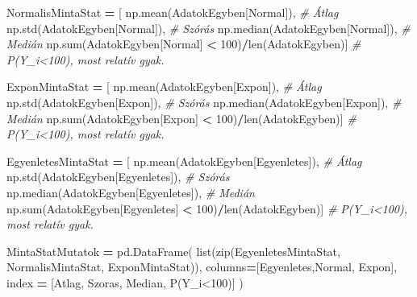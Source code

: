 \documentclass[
]{book}
\newenvironment{Shaded}{\begin{snugshade}}{\end{snugshade}}
\newcommand{\BuiltInTok}[1]{#1}
\newcommand{\CommentTok}[1]{\textcolor[rgb]{0.56,0.35,0.01}{\textit{#1}}}
\newcommand{\DecValTok}[1]{\textcolor[rgb]{0.00,0.00,0.81}{#1}}
\newcommand{\NormalTok}[1]{#1}
\newcommand{\OperatorTok}[1]{\textcolor[rgb]{0.81,0.36,0.00}{\textbf{#1}}}
\newcommand{\StringTok}[1]{\textcolor[rgb]{0.31,0.60,0.02}{#1}}
\begin{document}
\begin{Shaded}
\begin{Highlighting}[]
\NormalTok{NormalisMintaStat }\OperatorTok{=}\NormalTok{ [}
\NormalTok{  np.mean(AdatokEgyben[}\StringTok{\textquotesingle{}Normal\textquotesingle{}}\NormalTok{]), }\CommentTok{\# Átlag}
\NormalTok{  np.std(AdatokEgyben[}\StringTok{\textquotesingle{}Normal\textquotesingle{}}\NormalTok{]), }\CommentTok{\# Szórás}
\NormalTok{  np.median(AdatokEgyben[}\StringTok{\textquotesingle{}Normal\textquotesingle{}}\NormalTok{]), }\CommentTok{\# Medián}
\NormalTok{  np.}\BuiltInTok{sum}\NormalTok{(AdatokEgyben[}\StringTok{\textquotesingle{}Normal\textquotesingle{}}\NormalTok{] }\OperatorTok{\textless{}} \DecValTok{100}\NormalTok{)}\OperatorTok{/}\BuiltInTok{len}\NormalTok{(AdatokEgyben)] }\CommentTok{\# P(Y\_i\textless{}100), most relatív gyak.}

\NormalTok{ExponMintaStat }\OperatorTok{=}\NormalTok{ [}
\NormalTok{  np.mean(AdatokEgyben[}\StringTok{\textquotesingle{}Expon\textquotesingle{}}\NormalTok{]), }\CommentTok{\# Átlag}
\NormalTok{  np.std(AdatokEgyben[}\StringTok{\textquotesingle{}Expon\textquotesingle{}}\NormalTok{]), }\CommentTok{\# Szórás}
\NormalTok{  np.median(AdatokEgyben[}\StringTok{\textquotesingle{}Expon\textquotesingle{}}\NormalTok{]), }\CommentTok{\# Medián}
\NormalTok{  np.}\BuiltInTok{sum}\NormalTok{(AdatokEgyben[}\StringTok{\textquotesingle{}Expon\textquotesingle{}}\NormalTok{] }\OperatorTok{\textless{}} \DecValTok{100}\NormalTok{)}\OperatorTok{/}\BuiltInTok{len}\NormalTok{(AdatokEgyben)] }\CommentTok{\# P(Y\_i\textless{}100), most relatív gyak.}

\NormalTok{EgyenletesMintaStat }\OperatorTok{=}\NormalTok{ [}
\NormalTok{  np.mean(AdatokEgyben[}\StringTok{\textquotesingle{}Egyenletes\textquotesingle{}}\NormalTok{]), }\CommentTok{\# Átlag}
\NormalTok{  np.std(AdatokEgyben[}\StringTok{\textquotesingle{}Egyenletes\textquotesingle{}}\NormalTok{]), }\CommentTok{\# Szórás}
\NormalTok{  np.median(AdatokEgyben[}\StringTok{\textquotesingle{}Egyenletes\textquotesingle{}}\NormalTok{]), }\CommentTok{\# Medián}
\NormalTok{  np.}\BuiltInTok{sum}\NormalTok{(AdatokEgyben[}\StringTok{\textquotesingle{}Egyenletes\textquotesingle{}}\NormalTok{] }\OperatorTok{\textless{}} \DecValTok{100}\NormalTok{)}\OperatorTok{/}\BuiltInTok{len}\NormalTok{(AdatokEgyben)] }\CommentTok{\# P(Y\_i\textless{}100), most relatív gyak.}

\NormalTok{MintaStatMutatok }\OperatorTok{=}\NormalTok{ pd.DataFrame(}
  \BuiltInTok{list}\NormalTok{(}\BuiltInTok{zip}\NormalTok{(EgyenletesMintaStat, NormalisMintaStat, ExponMintaStat)),}
\NormalTok{  columns}\OperatorTok{=}\NormalTok{[}\StringTok{\textquotesingle{}Egyenletes\textquotesingle{}}\NormalTok{,}\StringTok{\textquotesingle{}Normal\textquotesingle{}}\NormalTok{, }\StringTok{\textquotesingle{}Expon\textquotesingle{}}\NormalTok{],}
\NormalTok{  index }\OperatorTok{=}\NormalTok{ [}\StringTok{\textquotesingle{}Atlag\textquotesingle{}}\NormalTok{, }\StringTok{\textquotesingle{}Szoras\textquotesingle{}}\NormalTok{, }\StringTok{\textquotesingle{}Median\textquotesingle{}}\NormalTok{, }\StringTok{\textquotesingle{}P(Y\_i\textless{}100)\textquotesingle{}}\NormalTok{]}
\NormalTok{)}


\end{Highlighting}
\end{Shaded}
\end{document}
